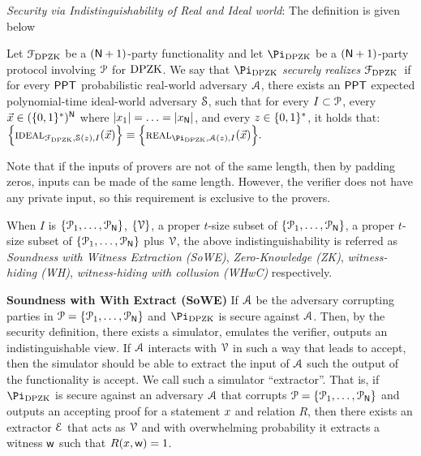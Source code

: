 \noindent\textit{Security via Indistinguishability of Real and Ideal world}: The definition is given below
\begin{definition}
Let $\mathcal{F}_{\text{DPZK}}$ be a $(\mathsf{N}+1)$-party  functionality and let $\Pi_{\DPZK}$ be a $(\mathsf{N}+1)$-party protocol involving $\mathcal{P}$ for $\text{DPZK}$. We say that  $\Pi_\DPZK$ {\em securely realizes} $\mathcal{F}_{\text{DPZK}}$~if for every $\mathsf{PPT}$ probabilistic  real-world adversary $\mathcal{A}$, there exists an $\mathsf{PPT}$  expected polynomial-time ideal-world adversary $\mathcal{S}$, such that for every $I \subset \mathcal{P}$, every $\vec{x} \in (\{0,1\}^*)^{\mathsf{N}}$ where $\left\lvert x_1 \right\rvert = \ldots= \left\lvert x_{\mathsf{N}} \right\rvert$, and every $z \in \{0,1\}^*$, it holds that:
	$\Big\{\Ideal_{\Func_{\DPZK}, \Sim(z),I}(\vec{x}) \Big\} \equiv \Big\{ \Real_{\Pi_\DPZK, \Adv(z),I}(\vec{x}) \Big\}. $

Note that if the inputs of provers are not of the same length, then by padding zeros, inputs can be made of the same length. However, the verifier does not have any private input, so this requirement is exclusive to the provers.

When $I$ is  $\{\mathcal{P}_1,\ldots,\mathcal{P}_{\mathsf{N}}\}$, $\{\mathcal{V}\}$, a proper $t$-size subset of $\{\mathcal{P}_1,\ldots,\mathcal{P}_{\mathsf{N}}\}$, a proper $t$-size subset of $\{\mathcal{P}_1,\ldots,\mathcal{P}_{\mathsf{N}}\}$ plus   $\mathcal{V}$, the above indistinguishability  is referred as {\em Soundness with Witness Extraction (SoWE)}, {\em Zero-Knowledge (ZK)}, {\em witness-hiding (WH)}, {\em witness-hiding with collusion (WHwC)} respectively.   	
\end{definition}

{\bf Soundness with With Extract (SoWE)} If $\mathcal{A}$ be the adversary corrupting parties in $\mathcal{P} = \{ \mathcal{P}_1, \ldots, \mathcal{P}_{\mathsf{N}}\}$ and $\Pi_\DPZK$ is secure against $\mathcal{A}$. Then, by the security definition, there exists a simulator, emulates the verifier, outputs an indistinguishable view. If $\mathcal{A}$ interacts with $\mathcal{V}$ in such a way that leads to accept, then the simulator should be able to extract the input of $\mathcal{A}$ such the output of the functionality is accept. We call such a simulator ``extractor''. 
That is, if $\Pi_{\DPZK}$ is secure against an adversary $\mathcal{A}$ that corrupts $\mathcal{P} = \{\mathcal{P}_1, \ldots, \mathcal{P}_{\mathsf{N}}\}$ and outputs an accepting proof for a statement ${x}$ and relation $R$, then there exists an extractor $\mathcal{E}$ that acts as $\mathcal{V}$ and with overwhelming probability it extracts a witness $\mathsf{w}$ such that $R({x}, \mathsf{w}) = 1$.

